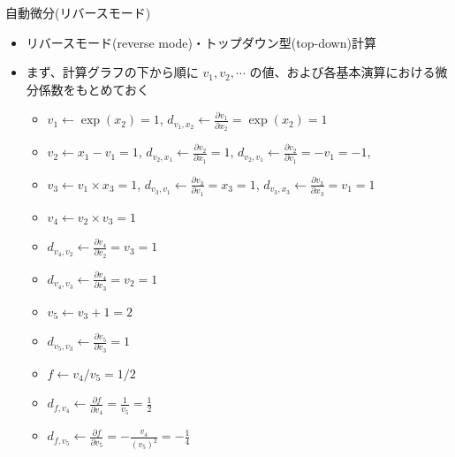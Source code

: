 \begin{frame}[t,fragile]{自動微分(リバースモード)}
  \begin{itemize}
  \item リバースモード(reverse mode)・トップダウン型(top-down)計算
  \item まず、計算グラフの下から順に $v_1, v_2, \cdots$ の値、および各基本演算における微分係数をもとめておく
    \begin{itemize}
    \item $v_1 \leftarrow \exp(x_2) = 1$, $d_{v_1,x_2} \leftarrow \frac{\partial v_1}{\partial x_2} = \exp(x_2) = 1$
    \item $v_2 \leftarrow x_1 - v_1 = 1$, $d_{v_2,x_1} \leftarrow \frac{\partial v_2}{\partial x_1} = 1$, $d_{v_2,v_1} \leftarrow \frac{\partial v_2}{\partial v_1} = -v_1 = -1$,
    \item $v_3 \leftarrow v_1 \times x_3 = 1$, $d_{v_3,v_1} \leftarrow \frac{\partial v_3}{\partial v_1} = x_3 = 1$, $d_{v_3,x_3} \leftarrow \frac{\partial v_3}{\partial x_3} = v_1 = 1$
    \item $v_4 \leftarrow v_2 \times v_3 = 1$
    \item $d_{v_4,v_2} \leftarrow \frac{\partial v_4}{\partial v_2} = v_3 = 1$
    \item $d_{v_4,v_3} \leftarrow \frac{\partial v_4}{\partial v_3} = v_2 = 1$
    \item $v_5 \leftarrow v_3 + 1 = 2$
    \item $d_{v_5,v_3} \leftarrow \frac{\partial v_5}{\partial v_3} = 1$
    \item $f \leftarrow v_4 / v_5 = 1/2$
    \item $d_{f,v_4} \leftarrow \frac{\partial f}{\partial v_4} = \frac{1}{v_5} = \frac{1}{2}$
    \item $d_{f,v_5} \leftarrow \frac{\partial f}{\partial v_5} = -\frac{v_4}{(v_5)^2} = -\frac{1}{4}$
    \end{itemize}

\end{itemize}
\end{frame}
